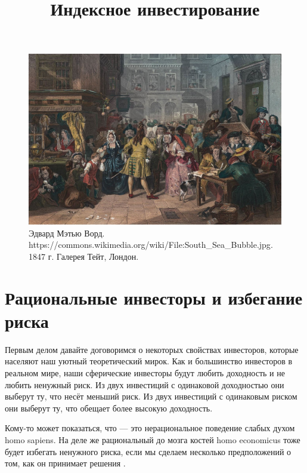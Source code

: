
\title{Индексное инвестирование}



\maketitle
\thispagestyle{empty}

\begin{figure}[h]
\centering
\includegraphics[width=\textwidth]{south_sea_bubble.jpg}
\captionsetup{labelformat=empty}
\caption{\small{
Эдвард Мэтью Ворд. 
{https://commons.wikimedia.org/wiki/File:South_Sea_Bubble.jpg}.
1847 г. Галерея Тейт, Лондон.
}}
\end{figure}
\setcounter{figure}{0}
\newpage

\tableofcontents

\section{Рациональные инвесторы и избегание риска}

Первым делом давайте договоримся о некоторых свойствах инвесторов, которые
населяют наш уютный теоретический мирок. Как и большинство инвесторов в реальном
мире, наши сферические инвесторы будут любить доходность и не любить ненужный
риск. Из двух инвестиций с одинаковой доходностью они выберут ту, что несёт
меньший риск. Из двух инвестиций с одинаковым риском они выберут ту, что обещает
более высокую доходность.

Кому-то может показаться, что  --- это
нерациональное поведение слабых духом homo sapiens. На деле же рациональный до
мозга костей homo economicus тоже будет избегать ненужного риска, если мы
сделаем несколько предположений о том, как он принимает решения
\cite[ch.~6.1]{bodie2014investments}.
 
